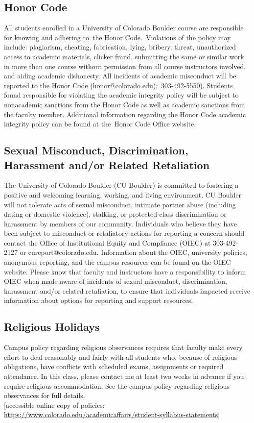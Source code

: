 \documentclass[9pt]{article}
\begin{document}
{\subsection*{Honor Code}
All students enrolled in a University of Colorado Boulder course are responsible for knowing and adhering to the Honor Code. Violations of the policy may include: plagiarism, cheating, fabrication, lying, bribery, threat, unauthorized access to academic materials, clicker fraud, submitting the same or similar work in more than one course without permission from all course instructors involved, and aiding academic dishonesty. All incidents of academic misconduct will be reported to the Honor Code (honor@colorado.edu); 303-492-5550). Students found responsible for violating the academic integrity policy will be subject to nonacademic sanctions from the Honor Code as well as academic sanctions from the faculty member. Additional information regarding the Honor Code academic integrity policy can be found at the Honor Code Office website.

\subsection*{Sexual Misconduct, Discrimination, Harassment and/or Related Retaliation}
The University of Colorado Boulder (CU Boulder) is committed to fostering a positive and welcoming learning, working, and living environment. CU Boulder will not tolerate acts of sexual misconduct, intimate partner abuse (including dating or domestic violence), stalking, or protected-class discrimination or harassment by members of our community. Individuals who believe they have been subject to misconduct or retaliatory actions for reporting a concern should contact the Office of Institutional Equity and Compliance (OIEC) at 303-492-2127 or cureport@colorado.edu. Information about the OIEC, university policies, anonymous reporting, and the campus resources can be found on the OIEC website. 
Please know that faculty and instructors have a responsibility to inform OIEC when made aware of incidents of sexual misconduct, discrimination, harassment and/or related retaliation, to ensure that individuals impacted receive information about options for reporting and support resources.
\subsection*{Religious Holidays}
Campus policy regarding religious observances requires that faculty make every effort to deal reasonably and fairly with all students who, because of religious obligations, have conflicts with scheduled exams, assignments or required attendance.  In this class, please contact me at least two weeks in advance if you require religious accommodation.  See the campus policy regarding religious observances for full details.
\\

[accessible online copy of policies: \url{https://www.colorado.edu/academicaffairs/student-syllabus-statements}]
}
\end{document}
